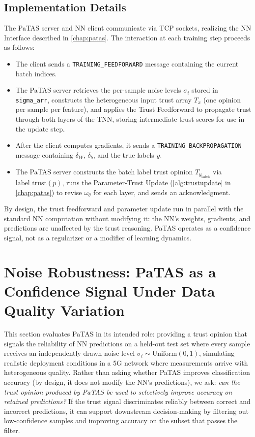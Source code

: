 \subsection{Implementation Details}
\label{sec:impl_details_propagation}

The \ac{PaTAS} server and \ac{NN} client communicate via \acs{TCP} sockets, realizing the \ac{NN} Interface described in \cref{chap:patas}. The interaction at each training step proceeds as follows:

\begin{itemize}
    \item The client sends a \texttt{TRAINING\_FEEDFORWARD} message containing the current batch indices.
    \item The \ac{PaTAS} server retrieves the per-sample noise levels $\sigma_i$ stored in \texttt{sigma\_arr}, constructs the heterogeneous input trust array $T_x$ (one opinion per sample per feature), and applies the Trust Feedforward to propagate trust through both layers of the \ac{TNN}, storing intermediate trust scores for use in the update step.
    \item After the client computes gradients, it sends a \texttt{TRAINING\_BACKPROPAGATION} message containing $\delta_W$, $\delta_b$, and the true labels $y$.
    \item The \ac{PaTAS} server constructs the batch label trust opinion $T_{y_{\text{batch}}}$ via $\text{label\_trust}(p)$, runs the Parameter-Trust Update (\cref{alg:trustupdate} in \cref{chap:patas}) to revise $\omega_\theta$ for each layer, and sends an acknowledgment.
\end{itemize}

By design, the trust feedforward and parameter update run in parallel with the standard \ac{NN} computation without modifying it: the \ac{NN}'s weights, gradients, and predictions are unaffected by the trust reasoning. \ac{PaTAS} operates as a confidence signal, not as a regularizer or a modifier of learning dynamics.

\section{Noise Robustness: \ac{PaTAS} as a Confidence Signal Under Data Quality Variation}
\label{sec:noise_robustness}

This section evaluates \ac{PaTAS} in its intended role: providing a trust opinion that signals the reliability of \ac{NN} predictions on a held-out test set where every sample receives an independently drawn noise level $\sigma_i \sim \text{Uniform}(0, 1)$, simulating realistic deployment conditions in a 5G network where measurements arrive with heterogeneous quality. Rather than asking whether \ac{PaTAS} improves classification accuracy (by design, it does not modify the \ac{NN}'s predictions), we ask: \emph{can the trust opinion produced by \ac{PaTAS} be used to selectively improve accuracy on retained predictions?} If the trust signal discriminates reliably between correct and incorrect predictions, it can support downstream decision-making by filtering out low-confidence samples and improving accuracy on the subset that passes the filter.

